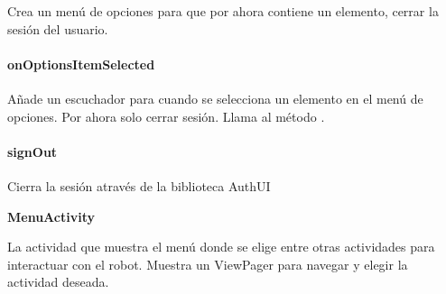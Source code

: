 \begin{fulllineitems}
\label{\detokenize{dev_docs:com.lar.cloudnao.SelectRobotActivity.onCreateOptionsMenu(Menu)}}
Crea un menú de opciones para que por ahora contiene un elemento, cerrar la sesión del usuario.

\end{fulllineitems}



\paragraph{onOptionsItemSelected}
\label{\detokenize{dev_docs:onoptionsitemselected}}

\begin{fulllineitems}
\label{\detokenize{dev_docs:com.lar.cloudnao.SelectRobotActivity.onOptionsItemSelected(MenuItem)}}
Añade un escuchador para cuando se selecciona un elemento en el menú de opciones. Por ahora solo cerrar sesión. Llama al método {\hyperref[\detokenize{dev_docs:com.lar.cloudnao.SelectRobotActivity.signOut()}]{}}.

\end{fulllineitems}



\paragraph{signOut}
\label{\detokenize{dev_docs:signout}}

\begin{fulllineitems}
\label{\detokenize{dev_docs:com.lar.cloudnao.SelectRobotActivity.signOut()}}
Cierra la sesión através de la biblioteca AuthUI

\end{fulllineitems}



\textbf{MenuActivity}
\label{\detokenize{dev_docs:menuactivity}}

\begin{fulllineitems}
\label{\detokenize{dev_docs:com.lar.cloudnao.MenuActivity}}
La actividad que muestra el menú donde se elige entre otras actividades para interactuar con el robot. Muestra un ViewPager para navegar y elegir la actividad deseada.

\end{fulllineitems}



